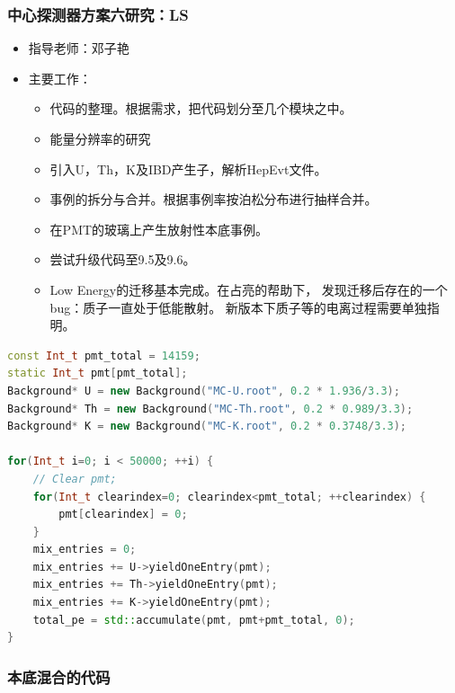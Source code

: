 \begin{frame}
    \frametitle{中心探测器方案六研究：LS}
    \begin{itemize}
        \item 指导老师：邓子艳
        \item 主要工作：
            \begin{itemize}
                \item 代码的整理。根据需求，把代码划分至几个模块之中。
                \item 能量分辨率的研究
                \item 引入U，Th，K及IBD产生子，解析HepEvt文件。
                \item 事例的拆分与合并。根据事例率按泊松分布进行抽样合并。
                \item 在PMT的玻璃上产生放射性本底事例。
                \item 尝试升级代码至9.5及9.6。
                \item Low Energy的迁移基本完成。在占亮的帮助下，
                      发现迁移后存在的一个bug：质子一直处于低能散射。
                      新版本下质子等的电离过程需要单独指明。
            \end{itemize}
    \end{itemize}
\end{frame}

\newsavebox{\BackgroundTest}
\begin{lrbox}{\BackgroundTest}
\begin{lstlisting}[language=C++]
const Int_t pmt_total = 14159;
static Int_t pmt[pmt_total];
Background* U = new Background("MC-U.root", 0.2 * 1.936/3.3);
Background* Th = new Background("MC-Th.root", 0.2 * 0.989/3.3);
Background* K = new Background("MC-K.root", 0.2 * 0.3748/3.3);     

for(Int_t i=0; i < 50000; ++i) {
    // Clear pmt;
    for(Int_t clearindex=0; clearindex<pmt_total; ++clearindex) {
        pmt[clearindex] = 0;
    }
    mix_entries = 0;
    mix_entries += U->yieldOneEntry(pmt);
    mix_entries += Th->yieldOneEntry(pmt);
    mix_entries += K->yieldOneEntry(pmt);
    total_pe = std::accumulate(pmt, pmt+pmt_total, 0);
}

\end{lstlisting}
\end{lrbox}

\begin{frame}
    \frametitle{本底混合的代码}
    \par\usebox{\BackgroundTest}
\end{frame}

